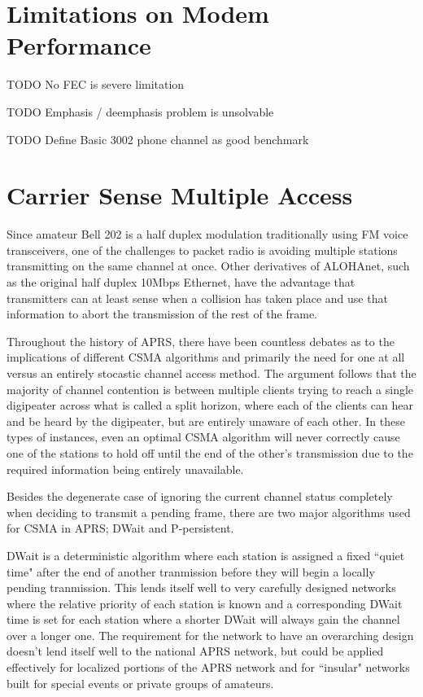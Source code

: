 \section{Limitations on Modem Performance}

TODO No FEC is severe limitation

TODO Emphasis / deemphasis problem is unsolvable

TODO Define Basic 3002 phone channel as good benchmark

\section{Carrier Sense Multiple Access}
\label{sec:bell202csma}

Since amateur Bell 202 is a half duplex modulation traditionally using FM voice 
transceivers, one of the challenges to packet radio is avoiding multiple stations
transmitting on the same channel at once. Other derivatives of ALOHAnet, such as 
the original half duplex 10Mbps Ethernet, have the advantage that transmitters can
at least sense when a collision has taken place and use that information to abort
the transmission of the rest of the frame.

Throughout the history of APRS, there have been 
countless debates as to the implications
of different CSMA algorithms and primarily 
the need for one at all versus an entirely 
stocastic channel access method. The argument follows that the majority of 
channel contention is between multiple clients trying to reach a single digipeater
across what is called a split horizon, where each of the clients can hear and be heard
by the digipeater, but are entirely unaware of each other. In these types of instances,
even an optimal CSMA algorithm will never correctly cause one of the stations to hold 
off until the end of the other's transmission due to the required information being
entirely unavailable.

Besides the degenerate case of ignoring the current channel status completely when 
deciding to transmit a pending frame, there are two major algorithms used for CSMA
in APRS;
DWait and P-persistent.

DWait is a deterministic algorithm where each station is assigned a fixed
``quiet time" after the end of another tranmission before they will begin a locally
pending tranmission. This lends itself well to very carefully designed networks
where the relative priority of each station is known and a corresponding DWait time
is set for each station where a shorter DWait will always gain the channel over a longer
one. The requirement for the network to have an overarching design doesn't lend itself
well to the national APRS network, but could be applied effectively for localized 
portions of the APRS network and for ``insular" networks built for special events or
private groups of amateurs.

